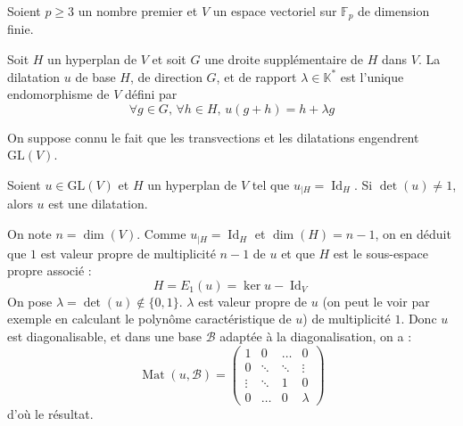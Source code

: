 


	
	
	Soient $p \geq 3$ un nombre premier et $V$ un espace vectoriel sur $\mathbb{F}_p$ de dimension finie.
	
	
	\begin{definition}
		Soit $H$ un hyperplan de $V$ et soit $G$ une droite supplémentaire de $H$ dans $V$.
		La dilatation $u$ de base $H$, de direction $G$, et de rapport $\lambda \in \mathbb{K}^*$ est l'unique endomorphisme de $V$ défini par
		\[ \forall g \in G, \, \forall h \in H, \, u(g+h) = h + \lambda g \]
	\end{definition}


	\begin{remark}
		\label{theoreme-de-frobenius-zolotarev-1}
		On suppose connu le fait que les transvections et les dilatations engendrent $\mathrm{GL}(V)$.
	\end{remark}

	
	\begin{lemma}
		\label{theoreme-de-frobenius-zolotarev-2}
		Soient $u \in \mathrm{GL}(V)$ et $H$ un hyperplan de $V$ tel que $u_{|H} = \operatorname{Id}_H$. Si $\det(u) \neq 1$, alors $u$ est une dilatation.
	\end{lemma}

	\begin{demonstration}
		On note $n = \dim(V)$. Comme $u_{|H} = \operatorname{Id}_H$ et $\dim(H) = n-1$, on en déduit que $1$ est valeur propre de multiplicité $n-1$ de $u$ et que $H$ est le sous-espace propre associé :
		\[ H = E_1(u) = \ker{u - \operatorname{Id}_V} \]
		On pose $\lambda = \det(u) \notin \{ 0, 1 \}$. $\lambda$ est valeur propre de $u$ (on peut le voir par exemple en calculant le polynôme caractéristique de $u$) de multiplicité $1$. Donc $u$ est diagonalisable, et dans une base $\mathcal{B}$ adaptée à la diagonalisation, on a :
		\[ \operatorname{Mat}(u, \mathcal{B}) =
		\begin{pmatrix}
			1 & 0 & \dots & 0 \\
			0 & \ddots & \ddots & \vdots \\
			\vdots & \ddots & 1 & 0 \\
			0 & \dots & 0 & \lambda
		\end{pmatrix}
		\]
		d'où le résultat.
	\end{demonstration}

